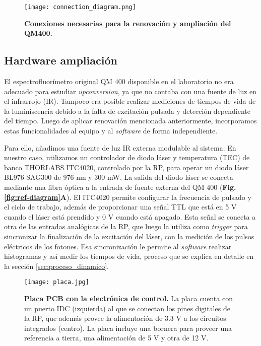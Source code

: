 \begin{figure}
     \centering
     \texttt{[image: connection\_diagram.png]}
     \caption{
    \textbf{Conexiones necesarias para la renovación y ampliación del QM400.}
    }
     \label{fig:connection_diagram}
\end{figure}



\subsection{Hardware ampliación}

El espectrofluorímetro original QM 400 disponible en el laboratorio no era adecuado para estudiar \textit{upconversion}, ya que no contaba con una fuente de luz en el infrarrojo (IR). 
Tampoco era posible realizar mediciones de tiempos de vida de la luminiscencia debido a la falta de excitación pulsada y detección dependiente del tiempo. 
Luego de aplicar renovación mencionada anteriormente, incorporamos estas funcionalidades al equipo y al \textit{software} de forma independiente.

Para ello, añadimos una fuente de luz IR externa modulable al sistema. 
En nuestro caso, utilizamos un controlador de diodo láser y temperatura (TEC) de banco THORLABS ITC4020, controlado por la RP, para operar un diodo láser BL976-SAG300 de 976 nm y 300 mW. 
La salida del diodo láser se conecta mediante una fibra óptica a la entrada de fuente externa del QM 400 (\textbf{Fig. \ref{fig:ref-diagram}A}). 
El ITC4020 permite configurar la frecuencia de pulsado y el ciclo de trabajo, además de proporcionar una señal TTL que está en 5 V cuando el láser está prendido y 0 V cuando está apagado.
Esta señal se conecta a otra de las entradas analógicas de la RP, que luego la utiliza como \textit{trigger} para sincronizar la finalización de la excitación del láser, con la medición de los pulsos eléctricos de los fotones.
Esa sincronización le permite al \textit{software} realizar histogramas y así medir los tiempos de vida, proceso que se explica en detalle en la sección \ref{sec:proceso_dinamico}.  


\begin{figure}[h]
     \centering
     \texttt{[image: placa.jpg]}
     \caption{\textbf{Placa PCB con la electrónica de control.} La placa cuenta con un puerto IDC (izquierda) al que se conectan los pines digitales de la RP, que además provee la alimentación de 3.3 V a los circuitos integrados (centro). La placa incluye una bornera para proveer una referencia a tierra, una alimentación de 5 V y otra de 12 V.}
     \label{fig:placa}
\end{figure}


